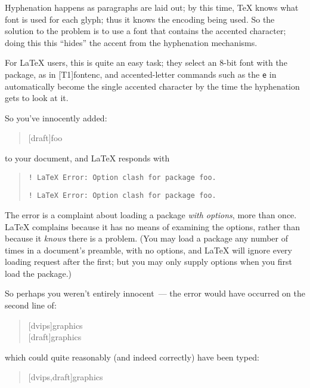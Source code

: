 Hyphenation happens as paragraphs are laid out; by this time, \TeX{}
knows what font is used for each glyph; thus it knows the encoding
being used.  So the solution to the problem is to use a font that
contains the accented character; doing this this ``hides'' the accent
from the hyphenation mechanisms.

For \LaTeX{} users, this is quite an easy task; they select an 8-bit
font with the package, as in [T1]{fontenc}, and
accented-letter commands such as the \texttt{e} in
 automatically become the
single accented character by the time the hyphenation gets to look at
it.



So you've innocently added:
\begin{quote}
[draft]{foo}
\end{quote}
to your document, and \LaTeX{} responds with
\begin{quote}
\begin{wideversion}
\begin{verbatim}
! LaTeX Error: Option clash for package foo.
\end{verbatim}
\end{wideversion}
\begin{narrowversion}
\begin{verbatim}
! LaTeX Error: Option clash for package foo.
\end{verbatim}
\end{narrowversion}
\end{quote}

The error is a complaint about loading a package %
\emph{with options}, more than once.  \LaTeX{} complains because it
has no means of examining the options, rather than because it
\emph{knows} there is a problem.  (You may load a package any number
of times in a document's preamble, with no options, and \LaTeX{} will
ignore every loading request after the first; but you may only supply
options when you first load the package.)

So perhaps you weren't entirely innocent~--- the error would have
occurred on the second line of:
\begin{quote}
[dvips]{graphics}\\
[draft]{graphics}
\end{quote}
which could quite reasonably (and indeed correctly) have been typed:
\begin{quote}
[dvips,draft]{graphics}
\end{quote}

